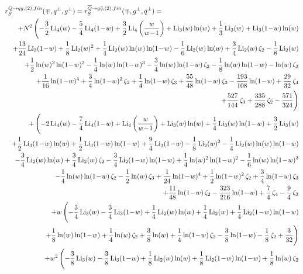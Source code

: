 \documentclass[paper,notoc,nohyper]{JHEP3}
\def\lx{\ln(w)}
\def\ly{\ln(1\!-\!w)}
\def\Libx{{\rm Li}_2(w)}
\def\Licx{{\rm Li}_3(w)}
\def\Lidx{{\rm Li}_4(w)}
\def\Liby{{\rm Li}_2(1\!-\!w)}
\def\Licy{{\rm Li}_3(1\!-\!w)}
\def\Lidy{{\rm Li}_4(1\!-\!w)}
\def\Lidz{{\rm Li}_4\left(\frac{w}{w\!-\!1}\right)}
\begin{document}
\begin{eqnarray}
\label{eq:r2qgpp}
\lefteqn{r_{S}^{Q \to qg,(2),fin}(\mp,q^{\pm},g^{\pm})=
r_{S}^{\overline{Q} \to g\bar q,(2),fin}(\mp,g^{\pm},\bar{q}^{\pm})=}\nonumber \\&&
+{N^2}\,\Biggl (-{3\over 2}\,{\Lidx}-{5\over 4}\,{\Lidy}+{3\over 2}\,{\Lidz}+{\Licx}\,{\lx}+{1\over 3}\,{\Licx}+{\Licy}\,{\lx}\nonumber \\&&
+{13\over 24}\,{\Licy}+{1\over 8}\,{\Libx^2}+{1\over 4}\,{\Libx}\,{\lx}\,{\ly}-{1\over 6}\,{\Libx}\,{\lx}+{3\over 4}\,{\Libx}\,{\zeta_2}-{1\over 8}\,{\Libx}\nonumber \\&&
+{1\over 2}\,{\lx^2}\,{\ly^2}-{1\over 4}\,{\lx}\,{\ly^3}-{3\over 4}\,{\lx}\,{\ly}\,{\zeta_2}-{1\over 8}\,{\lx}\,{\ly}-{\lx}\,{\zeta_3}\nonumber \\&&
+{1\over 16}\,{\ly^4}+{3\over 4}\,{\ly^2}\,{\zeta_2}+{1\over 4}\,{\ly}\,{\zeta_3}+{55\over 48}\,{\ly}\,{\zeta_2}-{193\over 108}\,{\ly}+{29\over 32}\,{\zeta_4}\nonumber \\&&
+{527\over 144}\,{\zeta_3}+{335\over 288}\,{\zeta_2}-{571\over 324}\Biggr )\nonumber \\&&
+\,\Biggl (-{2}\,{\Lidx}-{7\over 4}\,{\Lidy}+{\Lidz}+{\Licx}\,{\lx}+{1\over 4}\,{\Licx}\,{\ly}+{3\over 2}\,{\Licx}\nonumber \\&&
+{1\over 2}\,{\Licy}\,{\lx}+{1\over 2}\,{\Licy}\,{\ly}+{9\over 4}\,{\Licy}-{1\over 8}\,{\Libx^2}-{1\over 4}\,{\Libx}\,{\lx}\,{\ly}\nonumber \\&&
-{3\over 4}\,{\Libx}\,{\lx}+{3\over 4}\,{\Libx}\,{\zeta_2}-{3\over 4}\,{\Liby}\,{\ly}+{1\over 4}\,{\lx^2}\,{\ly^2}-{1\over 6}\,{\lx}\,{\ly^3}\nonumber \\&&
-{1\over 4}\,{\lx}\,{\ly}\,{\zeta_2}-{1\over 2}\,{\lx}\,{\zeta_3}+{1\over 24}\,{\ly^4}+{1\over 2}\,{\ly^2}\,{\zeta_2}+{3\over 4}\,{\ly}\,{\zeta_3}\nonumber \\&&
+{11\over 48}\,{\ly}\,{\zeta_2}-{323\over 216}\,{\ly}+{7\over 4}\,{\zeta_4}-{9\over 4}\,{\zeta_3}\nonumber \\&&
+{w}\,\Biggl (-{3\over 4}\,{\Licx}-{3\over 4}\,{\Licy}+{1\over 4}\,{\Libx}\,{\lx}+{1\over 4}\,{\Libx}+{1\over 4}\,{\Liby}\,{\ly}\nonumber \\&&
+{1\over 8}\,{\lx}\,{\ly}+{1\over 4}\,{\lx}\,{\zeta_2}+{3\over 8}\,{\lx}+{1\over 4}\,{\ly}\,{\zeta_2}-{3\over 8}\,{\ly}-{1\over 8}\,{\zeta_2}+{3\over 32}\Biggr )\nonumber \\&&
+{w^2}\,\Biggl (-{3\over 8}\,{\Licx}-{3\over 8}\,{\Licy}+{1\over 8}\,{\Libx}\,{\lx}+{1\over 8}\,{\Liby}\,{\ly}+{1\over 8}\,{\lx}\,{\zeta_2}\nonumber \\&&

\end{eqnarray}
\end{document}
